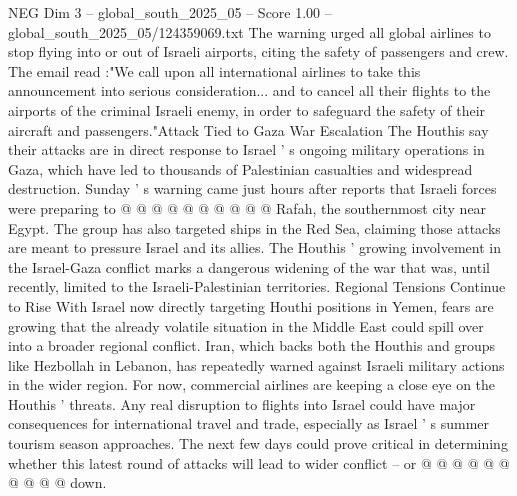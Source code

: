 \begin{textsample}{NEG Dim 3 – global\_south\_2025\_05 – Score 1.00 – global\_south\_2025\_05/124359069.txt}
The warning urged all global airlines to stop flying into or out of Israeli airports, citing the safety of passengers and crew.
The email read :"We call upon all international airlines to take this announcement into serious consideration... and to cancel all their flights to the airports of the criminal Israeli enemy, in order to safeguard the safety of their aircraft and passengers."Attack Tied to Gaza War Escalation The Houthis say their attacks are in direct response to Israel ' s ongoing military operations in Gaza, which have led to thousands of Palestinian casualties and widespread destruction.
Sunday ' s warning came just hours after reports that Israeli forces were preparing to @ @ @ @ @ @ @ @ @ @ Rafah, the southernmost city near Egypt.
The group has also targeted ships in the Red Sea, claiming those attacks are meant to pressure Israel and its allies.
The Houthis ' growing involvement in the Israel-Gaza conflict marks a dangerous widening of the war that was, until recently, limited to the Israeli-Palestinian territories.
Regional Tensions Continue to Rise With Israel now directly targeting Houthi positions in Yemen, fears are growing that the already volatile situation in the Middle East could spill over into a broader regional conflict.
Iran, which backs both the Houthis and groups like Hezbollah in Lebanon, has repeatedly warned against Israeli military actions in the wider region.
For now, commercial airlines are keeping a close eye on the Houthis ' threats.
Any real disruption to flights into Israel could have major consequences for international travel and trade, especially as Israel ' s summer tourism season approaches.
The next few days could prove critical in determining whether this latest round of attacks will lead to wider conflict -- or @ @ @ @ @ @ @ @ @ @ down.

\end{textsample}
